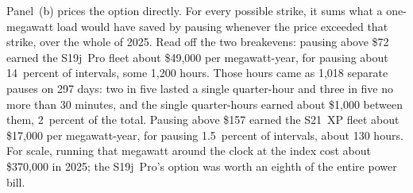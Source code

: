 Panel~(b) prices the option directly. For every possible strike, it sums what a one-megawatt load would have saved by pausing whenever the price exceeded that strike, over the whole of 2025. Read off the two breakevens: pausing above \$72 earned the S19j~Pro fleet about \$49,000 per megawatt-year, for pausing about 14~percent of intervals, some 1,200 hours. %
Those hours came as 1,018 separate pauses on 297 days: two in five lasted a single quarter-hour and three in five no more than 30 minutes, and the single quarter-hours earned about \$1,000 between them, 2~percent of the total. %
Pausing above \$157 earned the S21~XP fleet about \$17,000 per megawatt-year, for pausing 1.5~percent of intervals, about 130 hours. %
For scale, running that megawatt around the clock at the index cost about \$370,000 in 2025; the S19j~Pro's option was worth an eighth of the entire power bill. %


